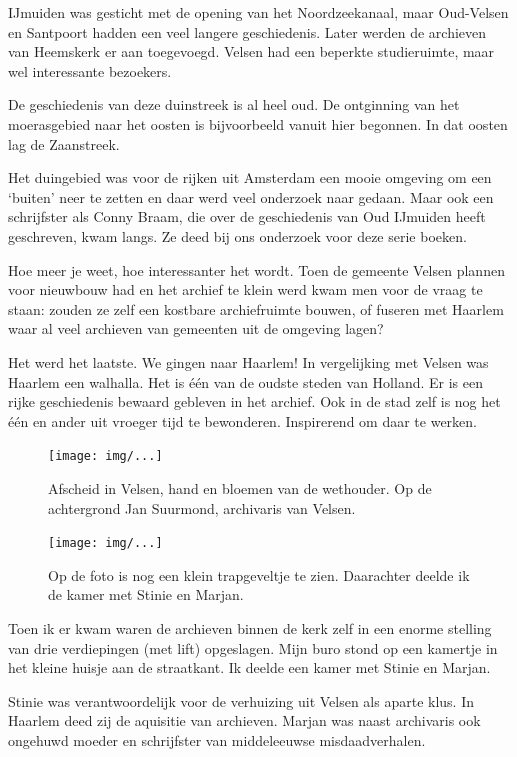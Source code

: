 \documentclass[12pt,twoside, openright]{memoir}
\begin{document}
IJmuiden was gesticht met de opening van het Noordzeekanaal, maar Oud-Velsen en Santpoort hadden een veel langere geschiedenis. Later werden de archieven van Heemskerk er aan toegevoegd. Velsen had een beperkte studieruimte, maar wel interessante bezoekers. 

De geschiedenis van deze duinstreek is al heel oud. De ontginning van het moerasgebied naar het oosten is bijvoorbeeld vanuit hier begonnen. In dat oosten lag de Zaanstreek. 

Het duingebied was voor de rijken uit Amsterdam een mooie omgeving om een `buiten' neer te zetten en daar werd veel onderzoek naar gedaan. Maar ook een schrijfster als Conny Braam, die over de geschiedenis van Oud IJmuiden heeft geschreven, kwam langs. Ze deed bij ons onderzoek voor deze serie boeken.

Hoe meer je weet, hoe interessanter het wordt. Toen de gemeente Velsen plannen voor nieuwbouw had en het archief te klein werd kwam men voor de vraag te staan: zouden ze zelf een kostbare archiefruimte bouwen, of fuseren met Haarlem waar al veel archieven van gemeenten uit de omgeving lagen? 

Het werd het laatste. We gingen naar Haarlem! In vergelijking met Velsen was Haarlem een walhalla. Het is één van de oudste steden van Holland. Er is een rijke geschiedenis bewaard gebleven in het archief. Ook in de stad zelf is nog het één en ander uit vroeger tijd te bewonderen. Inspirerend om daar te werken. 

\begin{figure}[t]
\texttt{[image: img/...]}
\caption{Afscheid in Velsen, hand en bloemen van de wethouder. Op de achtergrond Jan Suurmond, archivaris van Velsen.}
\end{figure}

\begin{figure}[t]
\texttt{[image: img/...]}
\caption{Op de foto is nog een klein trapgeveltje te zien. Daarachter deelde ik de kamer met Stinie en Marjan.}
\end{figure}

Toen ik er kwam waren de archieven binnen de kerk zelf in een enorme stelling van drie verdiepingen (met lift) opgeslagen. Mijn buro stond op een kamertje in het kleine huisje aan de straatkant. Ik deelde een kamer met Stinie en Marjan.

Stinie was verantwoordelijk voor de verhuizing uit Velsen als aparte klus. In Haarlem deed zij de aquisitie van archieven. Marjan was naast archivaris ook ongehuwd moeder en schrijfster van middeleeuwse misdaadverhalen.
\end{document}
